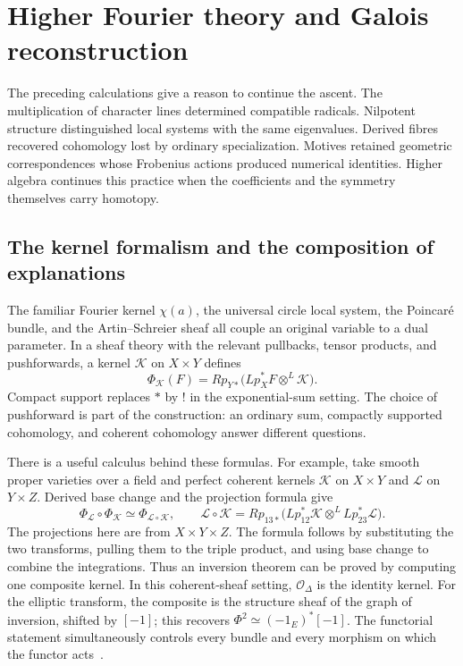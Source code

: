 \documentclass[11pt]{article}
\theoremstyle{remark}
\begin{document}
\section{Higher Fourier theory and Galois reconstruction}
\label{higher:section}

The preceding calculations give a reason to continue the ascent. The multiplication of character lines determined compatible radicals. Nilpotent structure distinguished local systems with the same eigenvalues. Derived fibres recovered cohomology lost by ordinary specialization. Motives retained geometric correspondences whose Frobenius actions produced numerical identities. Higher algebra continues this practice when the coefficients and the symmetry themselves carry homotopy.

\subsection{The kernel formalism and the composition of explanations}

The familiar Fourier kernel \(\chi(a)\), the universal circle local system, the Poincar\'e bundle, and the Artin--Schreier sheaf all couple an original variable to a dual parameter. In a sheaf theory with the relevant pullbacks, tensor products, and pushforwards, a kernel \(\mathcal K\) on \(X\times Y\) defines
\[
\Phi_{\mathcal K}(F)
=Rp_{Y*}\bigl(Lp_X^*F\otimes^L\mathcal K\bigr).
\]
Compact support replaces \(*\) by \(!\) in the exponential-sum setting. The choice of pushforward is part of the construction: an ordinary sum, compactly supported cohomology, and coherent cohomology answer different questions.

There is a useful calculus behind these formulas. For example, take smooth proper varieties over a field and perfect coherent kernels \(\mathcal K\) on \(X\times Y\) and \(\mathcal L\) on \(Y\times Z\). Derived base change and the projection formula give
\[
\Phi_{\mathcal L}\circ\Phi_{\mathcal K}
\simeq\Phi_{\mathcal L\circ\mathcal K},
\qquad
\mathcal L\circ\mathcal K
=Rp_{13*}\bigl(Lp_{12}^*\mathcal K\otimes^L Lp_{23}^*\mathcal L\bigr).
\]
The projections here are from \(X\times Y\times Z\). The formula follows by substituting the two transforms, pulling them to the triple product, and using base change to combine the integrations. Thus an inversion theorem can be proved by computing one composite kernel. In this coherent-sheaf setting, \(\mathcal O_\Delta\) is the identity kernel. For the elliptic transform, the composite is the structure sheaf of the graph of inversion, shifted by \([-1]\); this recovers \(\Phi^2\simeq(-1_E)^*[-1]\). The functorial statement simultaneously controls every bundle and every morphism on which the functor acts~\cite{chen}.
\end{document}
